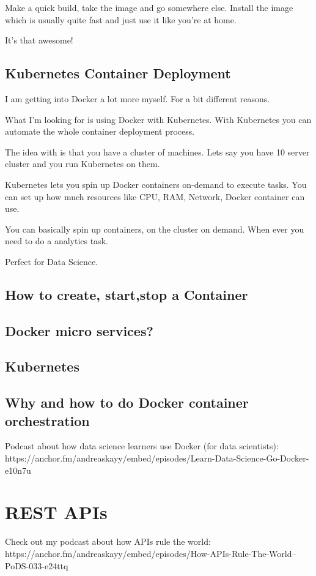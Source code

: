 \documentclass[12pt, numbers=noenddot]{scrreprt} %
\begin{document}
Make a quick build, take the image and go somewhere else. Install the image which is usually quite fast and just use it like you’re at home.

It’s that awesome!

\section{Kubernetes Container Deployment}

I am getting into Docker a lot more myself. For a bit different reasons.

What I’m looking for is using Docker with Kubernetes. With Kubernetes you can automate the whole container deployment process.

The idea with is that you have a cluster of machines. Lets say you have 10 server cluster and you run Kubernetes on them.

Kubernetes lets you spin up Docker containers on-demand to execute tasks. You can set up how much resources like CPU, RAM, Network, Docker container can use.

You can basically spin up containers, on the cluster on demand. When ever you need to do a analytics task.

Perfect for Data Science.
\section{How to create, start,stop a Container}
\section{Docker micro services?}
\section{Kubernetes}
\section{Why and how to do Docker container orchestration}
Podcast about how data science learners use Docker (for data scientists): https://anchor.fm/andreaskayy/embed/episodes/Learn-Data-Science-Go-Docker-e10n7u





\chapter{REST APIs}
Check out my podcast about how APIs rule the world: https://anchor.fm/andreaskayy/embed/episodes/How-APIs-Rule-The-World--PoDS-033-e24ttq
\end{document}
